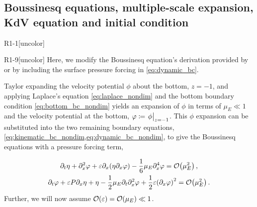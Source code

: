 \documentclass{jfm}
\renewcommand*{\epsilon}{\varepsilon}
\begin{document}
\subsection{\label{sec:boussinesq} Boussinesq equations, multiple-scale
expansion, KdV equation and initial condition}
\begin{LineLabel}{R1-1}[uncolor]
\begin{LineLabel}{R1-9}[uncolor]
Here, we modify the Boussinesq equation's derivation provided by
\citet{mei2005nonlinear} or \citet{ablowitz2011nonlinear} by including
the surface pressure forcing in \cref{eq:dynamic_bc}.
\end{LineLabel}
Taylor expanding the velocity potential $\phi$ about the bottom,
$z=-1$, and applying Laplace's
equation \cref{eq:laplace_nondim} and the bottom boundary
condition \cref{eq:bottom_bc_nondim} yields an expansion of $\phi$ in
terms of $\mu_E \ll 1$ and the velocity potential at the bottom,
$\varphi \coloneqq \eval{\phi}_{z=-1}$.
This $\phi$ expansion can be substituted into the two remaining boundary
equations, \cref{eq:kinematic_bc_nondim,eq:dynamic_bc_nondim}, to give
the Boussinesq equations with a pressure forcing term,
\end{LineLabel}
\begin{gather}
  \partial_t \eta + \partial_x^2 \varphi + \epsilon \partial_x
    \pqty{\eta \partial_x \varphi} -\frac{1}{6}\mu_E \partial^4_x
    \varphi = \order{\mu_E^2} \label{eq:kinematic_bc_varphi} \,, \\
  \partial_t \varphi + \epsilon P \partial_x \eta + \eta -
    \frac{1}{2}\mu_E \partial_t \partial_x^2 \varphi +
    \frac{1}{2}\epsilon\pqty{\partial_x \varphi}^2 = \order{\mu_E^2} \,.
    \label{eq:dynamic_bc_varphi}
\end{gather}
Further, we will now assume $\order{\epsilon} = \order{\mu_E} \ll 1$.
\end{document}
